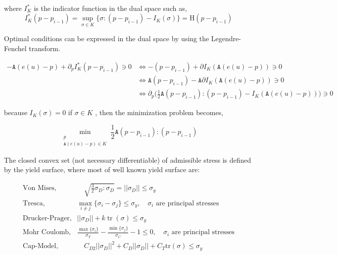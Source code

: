 \documentclass[10pt,oneside]{memoir}
\DeclareMathOperator{\tr}{tr}
\begin{document}
where $I^{*}_K$ is the indicator function in the dual space such as, $$I^*_K(p-p_{i-1})= \sup_{\sigma \in K} \{ \sigma:(p-p_{i-1}) - I_K(\sigma)  \} = \mathrm{H}(p-p_{i-1})$$


Optimal conditions can be expressed in the dual space by using the Legendre-Fenchel transform.


\begin{equation}
\begin{split}
-\mathtt{A} (e(u)-p) + \partial_p I^*_K(p-p_{i-1}) \ni 0 & \Leftrightarrow -(p-p_{i-1}) + \partial I_K(\mathtt{A} (e(u)-p)) \ni 0 \\
 & \Leftrightarrow   \mathtt{A}(p-p_{i-1}) - \mathtt{A}\partial I_K (\mathtt{A}(e(u)-p)) \ni 0 \\
& \Leftrightarrow  \partial_p \Big( \frac{1}{2}\mathtt{A}(p-p_{i-1}):(p-p_{i-1}) - I_K (\mathtt{A}(e(u)-p)) \Big) \ni 0
\end{split}
\end{equation}

because $I_K(\sigma) = 0$ if $\sigma \in K$ , then the minimization problem becomes,


$$ \min_{\substack{p \\ \mathtt{A}(e(u)-p) \in K}} \frac{1}{2}\mathtt{A} (p-p_{i-1}):(p-p_{i-1}) $$


The closed convex set (not necessary differentiable) of admissible stress is defined by the yield surface, where most of well known yield surface are:

\begin{equation}
\begin{split}
\text{Von Mises},& \quad \sqrt{\frac{3}{2}\sigma_D:\sigma_D} = ||\sigma_D|| \leq \sigma_y  \\
\text{Tresca},& \max_{i\neq j} \{ \sigma_i - \sigma_j \} \leq \sigma _y ,\quad  \sigma_i \text{ are principal stresses}   \\
\text{Drucker-Prager},& ||\sigma_D || + k \tr(\sigma) \leq \sigma_y \\
\text{Mohr Coulomb},& \frac{\max\{\sigma_i\}}{\sigma_T} - \frac{\min\{\sigma_j\}}{\sigma_C} -1 \leq 0 ,\quad  \sigma_i \text{ are principal stresses}  \\
\text{Cap-Model},& \quad C_{D2} ||\sigma_D||^2 + C_D||\sigma_D|| + C_T \text{tr} (\sigma) \leq \sigma_y \\
\end{split}
\end{equation}
\end{document}
